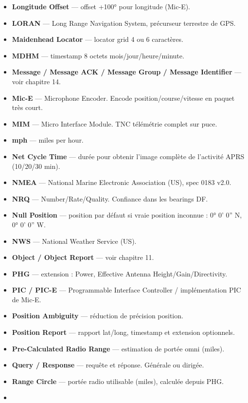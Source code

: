 {\begin{itemize}
\item
  \textbf{Longitude Offset} --- offset +100° pour longitude (Mic-E).
\item
  \textbf{LORAN} --- Long Range Navigation System, précurseur terrestre
  de GPS.
\item
  \textbf{Maidenhead Locator} --- locator grid 4 ou 6 caractères.
\item
  \textbf{MDHM} --- timestamp 8 octets mois/jour/heure/minute.
\item
  \textbf{Message / Message ACK / Message Group / Message Identifier}
  --- voir chapitre 14.
\item
  \textbf{Mic-E} --- Microphone Encoder. Encode position/course/vitesse
  en paquet très court.
\item
  \textbf{MIM} --- Micro Interface Module. TNC télémétrie complet sur
  puce.
\item
  \textbf{mph} --- miles per hour.
\item
  \textbf{Net Cycle Time} --- durée pour obtenir l'image complète de
  l'activité APRS (10/20/30 min).
\item
  \textbf{NMEA} --- National Marine Electronic Association (US), spec
  0183 v2.0.
\item
  \textbf{NRQ} --- Number/Rate/Quality. Confiance dans les bearings DF.
\item
  \textbf{Null Position} --- position par défaut si vraie position
  inconnue : 0° 0' 0'' N, 0° 0' 0'' W.
\item
  \textbf{NWS} --- National Weather Service (US).
\item
  \textbf{Object / Object Report} --- voir chapitre 11.
\item
  \textbf{PHG} --- extension : Power, Effective Antenna
  Height/Gain/Directivity.
\item
  \textbf{PIC / PIC-E} --- Programmable Interface Controller /
  implémentation PIC de Mic-E.
\item
  \textbf{Position Ambiguity} --- réduction de précision position.
\item
  \textbf{Position Report} --- rapport lat/long, timestamp et extension
  optionnels.
\item
  \textbf{Pre-Calculated Radio Range} --- estimation de portée omni
  (miles).
\item
  \textbf{Query / Response} --- requête et réponse. Générale ou dirigée.
\item
  \textbf{Range Circle} --- portée radio utilisable (miles), calculée
  depuis PHG.
\item

\end{itemize}}
